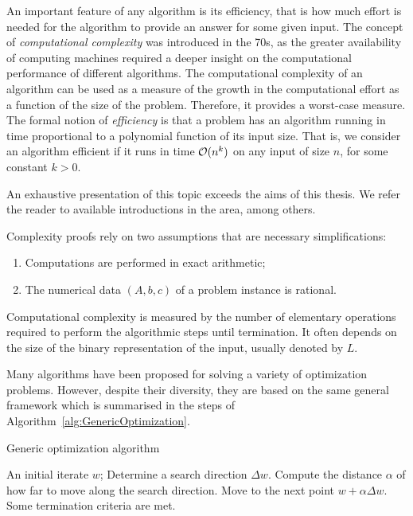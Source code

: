 An important feature of any algorithm is its efficiency, that is 
how much effort is needed for the algorithm to provide an answer
for some given input.
The concept of {\em computational complexity} was introduced in the 70s,
as the greater availability of computing machines required a deeper insight
on the computational performance of different algorithms.
The computational complexity of an algorithm can be used as a measure
of the growth in the computational effort
as a function of the size of the problem. Therefore, it provides 
a worst-case measure.
The formal notion of {\em efficiency} is that a problem has an 
algorithm running in time proportional to a polynomial function 
of its input size. That is, we consider an algorithm efficient
 if it runs in time $\mathcal{O}(n^k)$ on any input of size $n$, 
for some constant $k>0$.

An exhaustive presentation of this topic exceeds the aims of this thesis.
We refer the reader to available introductions in the area, 
\cite[Chapter~2]{Schrijver86} among others.

Complexity proofs rely on two assumptions that are necessary 
simplifications:
\begin{enumerate}
\item Computations are performed in exact arithmetic;
\item The numerical data $(A, b, c)$ of a problem instance is rational.
\end{enumerate}

Computational complexity is measured by the number of elementary operations
required to perform the algorithmic steps until termination. It often depends 
on the size of the binary representation of the input,
usually denoted by $L$.

Many algorithms have been proposed for solving a variety of optimization
problems. However, despite their diversity, they are based on the same 
general framework which is summarised in the steps of 
Algorithm~\ref{alg:GenericOptimization}.

\renewcommand{\algorithmicrequire}{\textbf{Given:}}
\renewcommand{\algorithmicrepeat}{\textbf{Repeat:}}
\renewcommand{\algorithmicuntil}{\textbf{Until}}
\begin{algorithm}[ht]
  \caption{Generic optimization algorithm}
    \begin{algorithmic}  \label{alg:GenericOptimization}
      \REQUIRE An initial iterate $w$;
      \smallskip
      \REPEAT
         \STATE Determine a search direction $\Delta w$.
         \smallskip
         \STATE Compute the distance $\alpha$ of how far to move along
	        the search direction.
         \smallskip
         \STATE Move to the next point $w + \alpha\Delta w$.
         \smallskip
      \UNTIL Some termination criteria are met.
  \end{algorithmic}
\end{algorithm}

